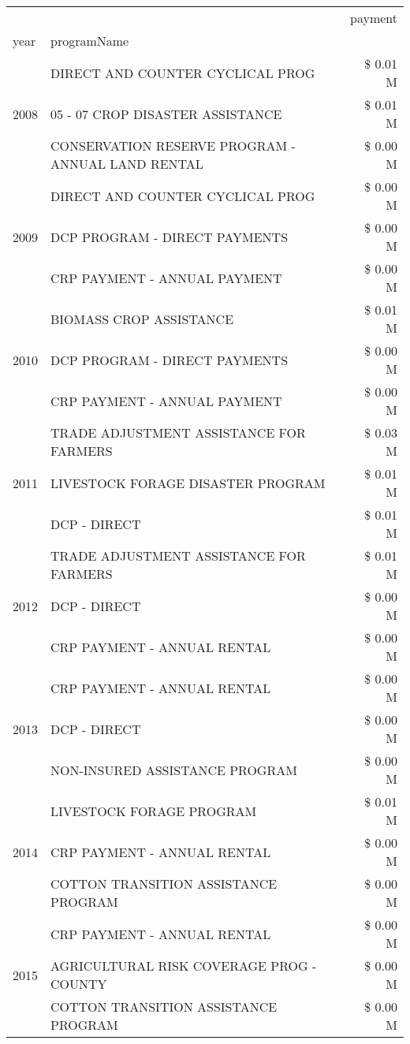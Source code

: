 \begin{tabular}{llr}
\toprule
 &  & payment \\
year & programName &  \\
\midrule
\multirow[t]{3}{*}{2008} & DIRECT AND COUNTER CYCLICAL PROG & \$ 0.01 M \\
 & 05 - 07 CROP DISASTER ASSISTANCE & \$ 0.01 M \\
 & CONSERVATION RESERVE PROGRAM - ANNUAL LAND RENTAL & \$ 0.00 M \\
\cline{1-3}
\multirow[t]{3}{*}{2009} & DIRECT AND COUNTER CYCLICAL PROG & \$ 0.00 M \\
 & DCP PROGRAM - DIRECT PAYMENTS & \$ 0.00 M \\
 & CRP PAYMENT - ANNUAL PAYMENT & \$ 0.00 M \\
\cline{1-3}
\multirow[t]{3}{*}{2010} & BIOMASS CROP ASSISTANCE & \$ 0.01 M \\
 & DCP PROGRAM - DIRECT PAYMENTS & \$ 0.00 M \\
 & CRP PAYMENT - ANNUAL PAYMENT & \$ 0.00 M \\
\cline{1-3}
\multirow[t]{3}{*}{2011} & TRADE ADJUSTMENT ASSISTANCE FOR FARMERS & \$ 0.03 M \\
 & LIVESTOCK FORAGE DISASTER PROGRAM & \$ 0.01 M \\
 & DCP - DIRECT & \$ 0.01 M \\
\cline{1-3}
\multirow[t]{3}{*}{2012} & TRADE ADJUSTMENT ASSISTANCE FOR FARMERS & \$ 0.01 M \\
 & DCP - DIRECT & \$ 0.00 M \\
 & CRP PAYMENT - ANNUAL RENTAL & \$ 0.00 M \\
\cline{1-3}
\multirow[t]{3}{*}{2013} & CRP PAYMENT - ANNUAL RENTAL & \$ 0.00 M \\
 & DCP - DIRECT & \$ 0.00 M \\
 & NON-INSURED ASSISTANCE PROGRAM & \$ 0.00 M \\
\cline{1-3}
\multirow[t]{3}{*}{2014} & LIVESTOCK FORAGE PROGRAM & \$ 0.01 M \\
 & CRP PAYMENT - ANNUAL RENTAL & \$ 0.00 M \\
 & COTTON TRANSITION ASSISTANCE PROGRAM & \$ 0.00 M \\
\cline{1-3}
\multirow[t]{3}{*}{2015} & CRP PAYMENT - ANNUAL RENTAL & \$ 0.00 M \\
 & AGRICULTURAL RISK COVERAGE PROG - COUNTY & \$ 0.00 M \\
 & COTTON TRANSITION ASSISTANCE PROGRAM & \$ 0.00 M \\
\cline{1-3}

\end{tabular}

